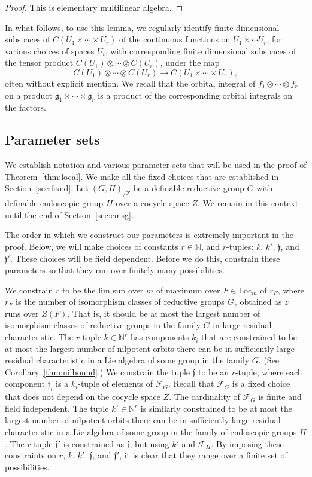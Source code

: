 \documentclass[12pt]{amsart}
\newcommand{\ring}[1]{{\mathbb #1}}
\def\s{{\mathfrak{f}}}
\newcommand{\cF}{\mathcal{F}}
\newcommand{\fg}{\mathfrak{g}}
\newcommand{\Loc}{\mathrm{Loc}}
\theoremstyle{plain}
\theoremstyle{definition}
\begin{document}
\begin{proof} This is elementary multilinear algebra.
\end{proof}


In what follows, to use this lemma, we regularly identify finite
dimensional subspaces of $C(U_1\times\cdots\times U_r)$ of the
continuous functions on $U_1\times\cdots U_r$, for various choices of spaces
$U_i$, with corresponding finite dimensional subspaces of the tensor
product $C(U_1)\otimes \cdots\otimes C(U_r)$, under the map
\[
C(U_1)\otimes \cdots\otimes C(U_r)\to C(U_1\times\cdots\times U_r),
\]
often without explicit mention.  We recall that the orbital integral
of $f_1\otimes\cdots\otimes f_r$ on a product
$\fg_1\times\cdots\times \fg_r$ is a product of the corresponding
orbital integrals on the factors.

\subsection{Parameter sets}

We establish notation and various parameter sets that will be used in
the proof of Theorem~\ref{thm:local}.  We make all the fixed choices
that are established in Section~\ref{sec:fixed}.  Let $(G,H)_{/Z}$ be
a definable reductive group $G$ with definable endoscopic group $H$
over a cocycle space $Z$.  We remain in this context until the end of
Section~\ref{sec:emsg}.

The order in which we construct our parameters is extremely important
in the proof.  Below, we will make choices of constants
$r\in\ring{N}$, and $r$-tuples: $k$, $k'$, $\s$,
and $\s'$.  These choices will be field dependent.  Before we do this,
constrain these parameters so that they run over finitely many
possibilities.

We constrain $r$ to be the lim sup over $m$ of maximum over
$F\in\Loc_m$ of $r_F$, where $r_F$ is the number of isomorphism
classes of reductive groups $G_z$ obtained as $z$ runs over $Z(F)$.
That is, it should be at most the largest number of isomorphism
classes of reductive groups in the family $G$ in large residual
characteristic.  The $r$-tuple $k\in\ring{N}^r$ has components $k_i$
that are constrained to be at most the largest number of nilpotent
orbits there can be in sufficiently large residual characteristic in a
Lie algebra of some group in the family $G$.  (See
Corollary~\ref{thm:nilbound}.) We constrain the tuple $\s$ to be an
$r$-tuple, where each component $\s_i$ is a $k_i$-tuple of elements of
$\cF_G$. Recall that $\cF_G$ is a fixed choice that does not depend on
the cocycle space $Z$.  The cardinality of $\cF_G$ is finite and field
independent.  The tuple $k'\in\ring{N}^r$ is similarly
constrained to be at most the largest number of nilpotent orbits there
can be in sufficiently large residual characteristic in a Lie algebra
of some group in the family of endoscopic groups $H$.  The $r$-tuple
$\s'$ is constrained as $\s$, but using $k'$ and $\cF_H$.  By imposing
these constraints on $r$, $k$, $k'$, $\s$, and $\s'$, it is clear that
they range over a finite set of possibilities.
\end{document}
